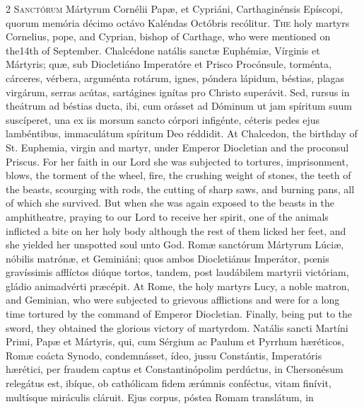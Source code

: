 \begin{paracol}{2}
\lettrine[lines=2]{S}{anctórum} Mártyrum 
 Cornélii Papæ, et Cypriáni, Carthaginénsis Epíscopi, quorum memória décimo 
 octávo Kaléndas Octóbris recólitur.
\switchcolumn
{}
\lettrine[lines=2]{T}{he} holy martyrs Cornelius, pope, 
 and Cyprian, bishop of Carthage, who were mentioned on the14th of September.
\switchcolumn*
{}
Chalcédone natális 
 sanctæ Euphémiæ, Vírginis et Mártyris; quæ, sub Diocletiáno Imperatóre et 
 Prisco Procónsule, torménta, cárceres, vérbera, arguménta rotárum, ignes, 
 póndera lápidum, béstias, plagas virgárum, serras acútas, sartágines ignítas 
 pro Christo superávit. Sed, rursus in theátrum ad béstias ducta, ibi, 
 cum orásset ad Dóminum ut jam spíritum suum suscíperet, una ex iis morsum 
 sancto córpori infigénte, céteris pedes ejus lambéntibus, immaculátum 
 spíritum Deo réddidit.
\switchcolumn
{}
At Chalcedon, the birthday of St. 
 Euphemia, virgin and martyr, under Emperor Diocletian and the proconsul 
 Priscus. For her faith in our Lord she was subjected to tortures, 
 imprisonment, blows, the torment of the wheel, fire, the crushing weight of 
 stones, the teeth of the beasts, scourging with rods, the cutting of sharp 
 saws, and burning pans, all of which she survived. But when she was 
 again exposed to the beasts in the amphitheatre, praying to our Lord to 
 receive her spirit, one of the animals inflicted a bite on her holy body 
 although the rest of them licked her feet, and she yielded her unspotted 
 soul unto God.
\switchcolumn*
{}
Romæ sanctórum Mártyrum 
 Lúciæ, nóbilis matrónæ, et Geminiáni; quos ambos Diocletiánus Imperátor, 
 pœnis gravíssimis afflíctos diúque tortos, tandem, post laudábilem martyrii 
 victóriam, gládio animadvérti præcépit.
\switchcolumn
{}
At Rome, the holy martyrs Lucy, a 
 noble matron, and Geminian, who were subjected to grievous afflictions and 
 were for a long time tortured by the command of Emperor Diocletian. 
 Finally, being put to the sword, they obtained the glorious victory of 
 martyrdom.
\switchcolumn*
{}
Natális sancti Martíni 
 Primi, Papæ et Mártyris, qui, cum Sérgium ac Paulum et Pyrrhum hæréticos, 
 Romæ coácta Synodo, condemnásset, ídeo, jussu Constántis, Imperatóris 
 hærétici, per fraudem captus et Constantinópolim perdúctus, in Chersonésum 
 relegátus est, ibíque, ob cathólicam fidem ærúmnis conféctus, vitam finívit, 
 multísque miráculis cláruit. Ejus corpus, póstea Romam translátum, in 

\end{paracol}
